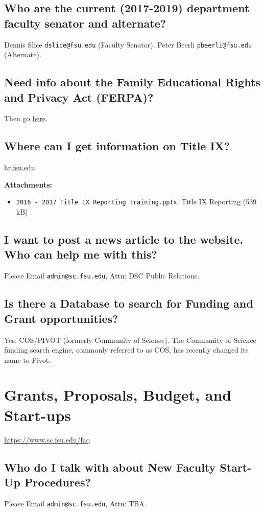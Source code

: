 \documentclass[12pt,a4paper]{article}
\begin{document}
\subsection{Who are the current (2017-2019) department faculty senator and alternate?}
Dennis Slice \texttt{dslice@fsu.edu} (Faculty Senator). Peter Beerli \texttt{pbeerli@fsu.edu} (Alternate).

\subsection{Need info about the Family Educational Rights and Privacy Act (FERPA)?}
Then go \href{http://registrar.fsu.edu/ferpa/}{here}.

\subsection{Where can I get information on Title IX?}
\url{hr.fsu.edu}
\vspace{1em}

\noindent\textbf{Attachments:}
\begin{itemize}
    \item \texttt{2016 - 2017 Title IX Reporting training.pptx}: Title IX Reporting (539 kB)
\end{itemize}

\subsection{I want to post a news article to the website. Who can help me with this?}
Please Email \texttt{admin@sc.fsu.edu}, Attn: DSC Public Relations.

\subsection{Is there a Database to search for Funding and Grant opportunities?}
Yes. COS/PIVOT (formerly Community of Science). The Community of Science funding search engine, commonly referred to as COS, has recently changed its name to Pivot.

\section{Grants, Proposals, Budget, and Start-ups}
\url{https://www.sc.fsu.edu/faq}
\subsection{Who do I talk with about New Faculty Start-Up Procedures?}
Please Email \texttt{admin@sc.fsu.edu}, Attn: TBA.
\end{document}
